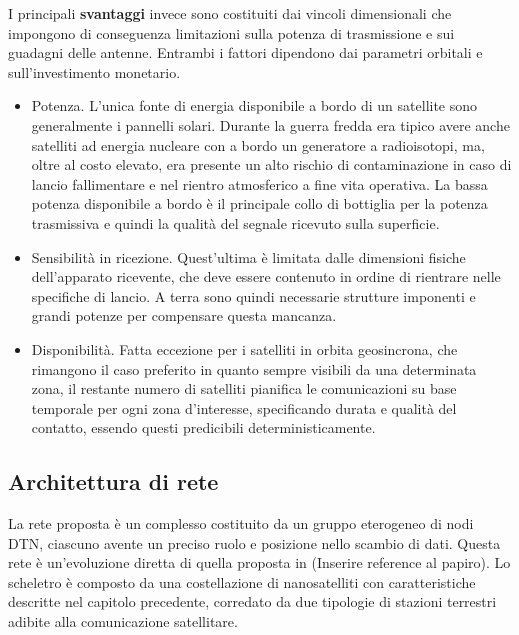 \documentclass[a4paper]{article}
\begin{document}
			I principali {\bf svantaggi} invece sono costituiti dai vincoli dimensionali che impongono di conseguenza limitazioni sulla potenza di trasmissione e sui guadagni delle antenne.	Entrambi i fattori dipendono dai parametri orbitali e sull'investimento monetario. 
			\begin{itemize}
				\item Potenza. L'unica fonte di energia disponibile a bordo di un satellite sono generalmente i pannelli solari. Durante la guerra fredda era tipico avere anche satelliti ad energia nucleare con a bordo un generatore a radioisotopi, ma, oltre al costo elevato, era presente un alto rischio di contaminazione in caso di lancio fallimentare e nel rientro atmosferico a fine vita operativa.
				La bassa potenza disponibile a bordo è il principale collo di bottiglia per la potenza trasmissiva e quindi la qualità del segnale ricevuto sulla superficie. 
				\item Sensibilità in ricezione. Quest'ultima è limitata dalle dimensioni fisiche dell'apparato ricevente, che deve essere contenuto in ordine di rientrare nelle specifiche di lancio. A terra sono quindi necessarie strutture imponenti e grandi potenze per compensare questa mancanza. 
				\item Disponibilità. Fatta eccezione per i satelliti in orbita geosincrona, che rimangono il caso preferito in quanto sempre visibili da una determinata zona, il restante numero di satelliti pianifica le comunicazioni su base temporale per ogni zona d'interesse, specificando durata e qualità del contatto, essendo questi predicibili deterministicamente.
				 
			\end{itemize}
			
			
		
		\subsection{Architettura di rete}	
		
		La rete proposta è un complesso costituito da un gruppo eterogeneo di nodi DTN, ciascuno avente un preciso ruolo e posizione nello scambio di dati. Questa rete è un'evoluzione diretta di quella proposta in (Inserire reference al papiro). Lo scheletro è composto da una costellazione di nanosatelliti con caratteristiche descritte nel capitolo precedente, corredato da due tipologie di stazioni terrestri adibite alla comunicazione satellitare. 
		
\end{document}

